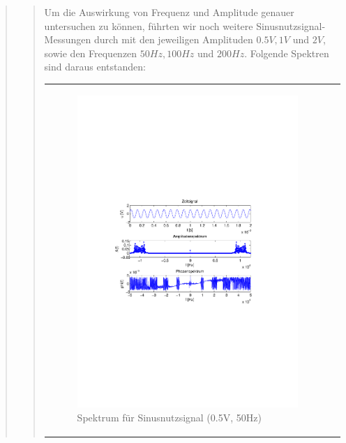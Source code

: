 \begin{quote}
\begin{quote}
        Um die Auswirkung von Frequenz und Amplitude genauer untersuchen zu
        können, führten wir noch weitere Sinusnutzsignal-Messungen durch mit den
        jeweiligen Amplituden $0.5V, 1V$ und $2V$, sowie den Frequenzen $50Hz,
        100Hz$ und $200Hz$. Folgende Spektren sind daraus entstanden:
        
               \begin{center}
            \begin{tabular}{ll}

            \hspace{-14em}
                \begin{minipage}{0.6\textwidth}

                    \begin{figure}[H]
                        \label{fig:}
                        \includegraphics[scale=0.5, trim = 2cm 6.5cm 1.5cm
                        8.5cm, clip]{./Bilder/sin_a05_f50}
                        \caption{Spektrum für Sinusnutzsignal (0.5V, 50Hz)}
                    \end{figure}


\end{minipage}
\end{tabular}
\end{center}
\end{quote}
\end{quote}
